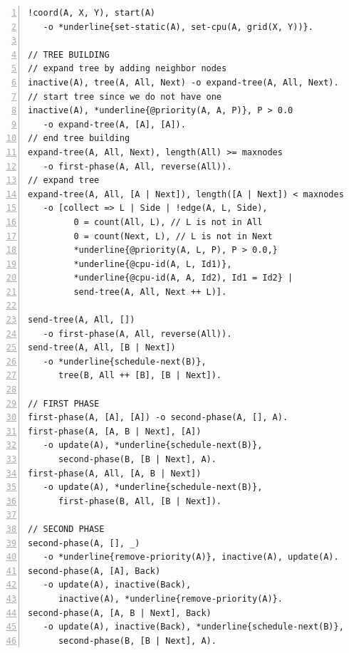 \begin{topfig}
\scriptsize\begin{Verbatim}[numbers=left,commandchars=*\{\}]
!coord(A, X, Y), start(A)
   -o *underline{set-static(A), set-cpu(A, grid(X, Y))}.

// TREE BUILDING
// expand tree by adding neighbor nodes
inactive(A), tree(A, All, Next) -o expand-tree(A, All, Next).
// start tree since we do not have one
inactive(A), *underline{@priority(A, A, P)}, P > 0.0
   -o expand-tree(A, [A], [A]).
// end tree building
expand-tree(A, All, Next), length(All) >= maxnodes
   -o first-phase(A, All, reverse(All)).
// expand tree
expand-tree(A, All, [A | Next]), length([A | Next]) < maxnodes
   -o [collect => L | Side | !edge(A, L, Side),
         0 = count(All, L), // L is not in All
         0 = count(Next, L), // L is not in Next
         *underline{@priority(A, L, P), P > 0.0,}
         *underline{@cpu-id(A, L, Id1)},
         *underline{@cpu-id(A, A, Id2), Id1 = Id2} |
         send-tree(A, All, Next ++ L)].

send-tree(A, All, [])
   -o first-phase(A, All, reverse(All)).
send-tree(A, All, [B | Next])
   -o *underline{schedule-next(B)},
      tree(B, All ++ [B], [B | Next]).

// FIRST PHASE
first-phase(A, [A], [A]) -o second-phase(A, [], A).
first-phase(A, [A, B | Next], [A])
   -o update(A), *underline{schedule-next(B)},
      second-phase(B, [B | Next], A).
first-phase(A, All, [A, B | Next])
   -o update(A), *underline{schedule-next(B)},
      first-phase(B, All, [B | Next]).

// SECOND PHASE
second-phase(A, [], _)
   -o *underline{remove-priority(A)}, inactive(A), update(A).
second-phase(A, [A], Back)
   -o update(A), inactive(Back),
      inactive(A), *underline{remove-priority(A)}.
second-phase(A, [A, B | Next], Back)
   -o update(A), inactive(Back), *underline{schedule-next(B)},
      second-phase(B, [B | Next], A).
\end{Verbatim}
\end{topfig}
\normalsize

